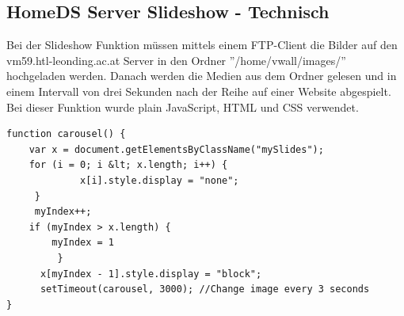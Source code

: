 \subsection{HomeDS Server Slideshow - Technisch}\label{sec:slideshowtechnical}
Bei der Slideshow Funktion müssen mittels einem FTP-Client die Bilder auf den vm59.htl-leonding.ac.at Server in den Ordner ''/home/vwall/images/'' hochgeladen werden. Danach werden die Medien aus dem Ordner gelesen und in einem Intervall von drei Sekunden nach der Reihe auf einer Website abgespielt. Bei dieser Funktion wurde plain JavaScript, HTML und CSS verwendet.

\begin{lstlisting}[caption={Carousel JavaScript}]
function carousel() {
    var x = document.getElementsByClassName("mySlides");
    for (i = 0; i &lt; x.length; i++) {
    		 x[i].style.display = "none";
  	 }
     myIndex++;
   	if (myIndex > x.length) {
   		myIndex = 1
    	 }
      x[myIndex - 1].style.display = "block";
      setTimeout(carousel, 3000); //Change image every 3 seconds
}
\end{lstlisting}

